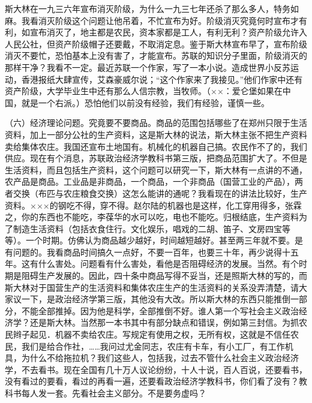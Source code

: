 斯大林在一九三六年宣布消灭阶级，为什么一九三七年还杀了那么多人，特务如麻。我看消灭阶级这个问题让他吊着，不忙宣布为好。阶级消灭究竟何时宣布才有利，如宣布消灭了，地主都是农民，资本家都是工人，有利无利？资产阶级允许入人民公社，但资产阶级帽子还要戴，不取消定息。鉴于斯大林宣布早了，宣布阶级消灭不要忙，恐怕基本上没有害了，才能宣布。苏联的知识分子里面，阶级消灭的那样干净？我看不一定。最近苏联一个作家，写了一本小说。造成世界小反苏运动，香港报纸大肆宣传，艾森豪威尔说；“这个作家来了我接见。”他们作家中还有资产阶级，大学毕业生中还有那么人信宗教，当牧师。（××：爱仑堡如果在中国，就是一个右派。）恐怕他们以前没有经验，我们有经验，谨慎一些。

（六）经济理论问题。究竟要不要商品。商品的范围包括哪些了在郑州只限于生活资料，加上一部分公社的生产资料，这是斯大林的说法，斯大林主张不把生产资料卖给集体农庄。我国还宣布土地国有。机械化的机器自己搞。农民作不了的，我们供应。现在有个消息，苏联政治经济学教科书第三版，把商品范围扩大了。不但是生活资料，而且包括生产资料，这个问题可以研究一下，斯大林有一点讲的不通，农产品是商品。工业品是非商品，一个商品，一个非商品（国营工业的产品），两者交换（布匹与农庄粮食交换）这怎么能讲的通呢？我看现在的讲法比较好，生产资料。×××的钢吃不得，穿不得。赵尔陆的机器也是这样，化工穿用得多，张霖之，你的东西也不能吃，李葆华的水可以吃，电也不能吃。归根结底，生产资料为了制造生活资料（包括衣食住行。文化娱乐，唱戏的二胡、笛子、文房四宝等等）。一个时期。仿佛认为商品越少越好，时间越短越好。甚至两三年就不要。是有问题的。我看商品时间搞久一点好，不要一百年，也要三十年，再少说得十五年。这有什么害处。问题看有什么害处，看他是否阻碍经济的发展。当然。有个时期是阻碍生产发展的。因此，四十条中商品写得不妥当，还是照斯大林的写的，而斯大林对于国营生产的生活资料和集体农庄生产的生活资料的关系没弄清楚，请大家议一下，是政治经济学第三版，其他没有大改。所以斯大林的东西只能推倒一部分，不能全部推掉。因为他是科学，全部推倒不好。谁人第一个写社会主义政治经济学？还是斯大林。当然那一本书其中有部分缺点和错误，例如第三封信。为抓农民辫子起见．机器不卖给农庄。写规定有使用之权，无所有权，这就是不信任农民，我们是给合作社，……我问过尤金同志，农庄有卡车，有小工厂，有工作机具，为什么不给拖拉机？我们这些人，包括我，过去不管什么社会主义政治经济学，不去看书。现在全国有几十万人议论纷纷，十人十说，百人百说，还要看书，没有看过的要看，看过的再看一遍，还要看政治经济学教科书，你们看了没有？教科书每人发一套。先看社会主义部分。不是要务虚吗？

